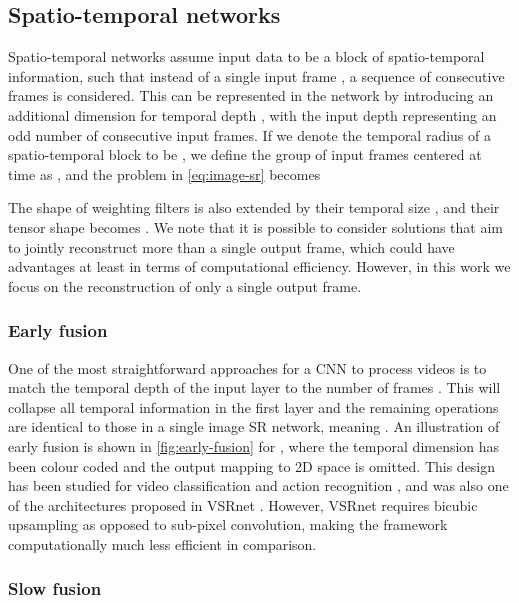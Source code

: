 \documentclass[10pt,twocolumn,letterpaper]{article}
\begin{document}
\subsection{Spatio-temporal networks}\label{ssec:st-networks}

Spatio-temporal networks assume input data to be a block of spatio-temporal information, such that instead of a single input frame , a sequence of consecutive frames is considered. This can be represented in the network by introducing an additional dimension for temporal depth , with the input depth  representing an odd number of consecutive input frames. If we denote the temporal radius of a spatio-temporal block to be , we define the group of input frames centered at time  as , and the problem in \cref{eq:image-sr} becomes

The shape of weighting filters  is also extended by their temporal size , and their tensor shape becomes . We note that it is possible to consider solutions that aim to jointly reconstruct more than a single output frame, which could have advantages at least in terms of computational efficiency. However, in this work we focus on the reconstruction of only a single output frame.



\subsubsection{Early fusion}

One of the most straightforward approaches for a \gls{CNN} to process videos is to match the temporal depth of the input layer to the number of frames . This will collapse all temporal information in the first layer and the remaining operations are identical to those in a single image \gls{SR} network, meaning . An illustration of early fusion is shown in \cref{fig:early-fusion} for , where the temporal dimension has been colour coded and the output mapping to 2D space is omitted. This design has been studied for video classification and action recognition \cite{Karpathy2014a, Tran2015}, and was also one of the architectures proposed in VSRnet \cite{Kappeler2016}. However, VSRnet requires bicubic upsampling as opposed to sub-pixel convolution, making the framework computationally much less efficient in comparison.



\subsubsection{Slow fusion}
\end{document}
